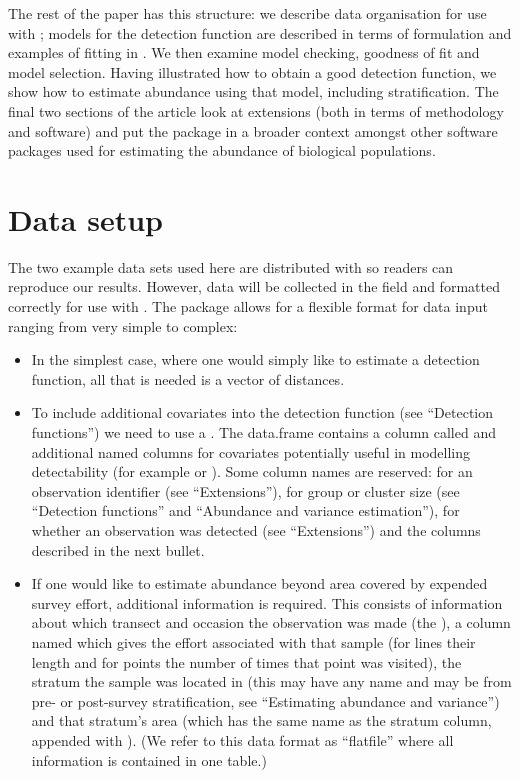 \documentclass[article]{jss}
\begin{document}
The rest of the paper has this structure: we describe data organisation
for use with ; models for the detection function are
described in terms of formulation and examples of fitting in
. We then examine model checking, goodness of fit and model
selection. Having illustrated how to obtain a good detection function,
we show how to estimate abundance using that model, including
stratification. The final two sections of the article look at extensions
(both in terms of methodology and software) and put the package in a
broader context amongst other software packages used for estimating the
abundance of biological populations.

\section{Data setup}\label{data-setup}

The two example data sets used here are distributed with 
so readers can reproduce our results. However, data will be collected in
the field and formatted correctly for use with . The
package allows for a flexible format for data input ranging from very
simple to complex:

\begin{itemize}
\itemsep1pt\parskip0pt
\item
  In the simplest case, where one would simply like to estimate a
  detection function, all that is needed is a vector of distances.
\item
  To include additional covariates into the detection function (see
  ``Detection functions'') we need to use a . The
  data.frame contains a column called  and additional
  named columns for covariates potentially useful in modelling
  detectability (for example  or ). Some
  column names are reserved:  for an observation identifier
  (see ``Extensions''),  for group or cluster size (see
  ``Detection functions'' and ``Abundance and variance estimation''),
   for whether an observation was detected (see
  ``Extensions'') and the columns described in the next bullet.
\item
  If one would like to estimate abundance beyond area covered by
  expended survey effort, additional information is required. This
  consists of information about which transect and occasion the
  observation was made (the ), a column named
   which gives the effort associated with that sample (for
  lines their length and for points the number of times that point was
  visited), the stratum the sample was located in (this may have any
  name and may be from pre- or post-survey stratification, see
  ``Estimating abundance and variance'') and that stratum's area (which
  has the same name as the stratum column, appended with ).
  (We refer to this data format as ``flatfile'' where all information is
  contained in one table.)
\end{itemize}
\end{document}
